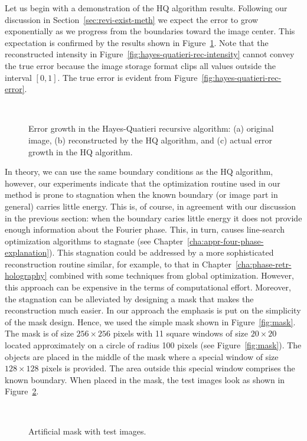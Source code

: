 Let us begin with a demonstration of the HQ algorithm
results. Following our discussion in Section~\ref{sec:revi-exist-meth}
we expect the error to grow exponentially as we progress from the
boundaries toward the image center. This expectation is confirmed by
the results shown in Figure~\ref{fig:hayes-quatieri-reconstruction}. Note
that the reconstructed intensity in
Figure~\ref{fig:hayes-quatieri-rec-intensity} cannot convey the true
error because the image storage format clips all values outside the interval
$[0,1]$. The true error is evident from
Figure~\ref{fig:hayes-quatieri-rec-error}.
\begin{figure}[H]
  \centering
  \qquad{}
  \\
  \caption[Error growth in the Hayes-Quatieri recursive algorithm]{Error growth in the Hayes-Quatieri recursive algorithm:
  (a) original image, (b) reconstructed by the HQ algorithm, and (c)
  actual error growth in the HQ algorithm.}
  \label{fig:hayes-quatieri-reconstruction}
\end{figure}

In theory, we can use the same boundary conditions as the HQ
algorithm, however, our experiments indicate that the optimization
routine used in our method is prone to stagnation when the known
boundary (or image part in general) carries little energy. This is,
of course, in agreement with our discussion in the previous section:
when the boundary caries little energy it does not provide enough
information about the Fourier phase. This, in turn, causes
line-search optimization algorithms to stagnate (see
Chapter~\ref{cha:appr-four-phase-explanation}). This stagnation could
be addressed by a more sophisticated reconstruction routine similar,
for example, to that in Chapter~\ref{cha:phase-retr-holography}
combined with some techniques from global optimization.  However, this
approach can be expensive in the terms of computational
effort. Moreover, the stagnation can be alleviated by designing a mask
that makes the reconstruction much easier. In our approach the
emphasis is put on the simplicity of the mask design. Hence, we used
the simple mask shown in Figure~\ref{fig:mask}.  The mask is of size
$256\times 256$ pixels with 11 square windows of size $20\times 20$
located approximately on a circle of radius 100 pixels (see
Figure~\ref{fig:mask}). The objects are placed in the middle of the
mask where a special window of size $128\times128$ pixels is
provided. The area outside this special window comprises the known
boundary. When placed in the mask, the test images look as shown in
Figure~\ref{fig:mask-withimages}.
\begin{figure}[H]
  \centering
  \\
  \caption{Artificial mask with test images.}
  \label{fig:mask-withimages}
\end{figure}

